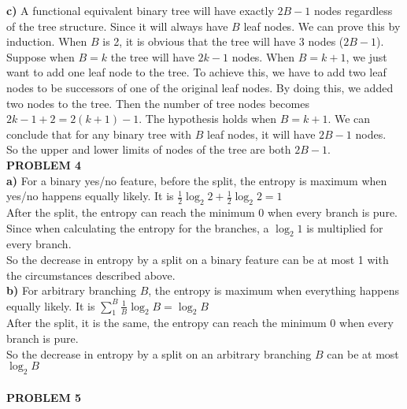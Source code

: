 \documentclass[11pt,a4paper,fleqn]{article}
\begin{document}
\textbf{c)} A functional equivalent binary tree will have exactly $2B-1$ nodes regardless of the tree structure. Since it will always have $B$ leaf nodes. We can prove this by induction. When $B$ is 2, it is obvious that the tree will have 3 nodes ($2B-1$). Suppose when $B=k$ the tree will have $2k-1$ nodes. When $B=k+1$, we just want to add one leaf node to the tree. To achieve this, we have to add two leaf nodes to be successors of one of the original leaf nodes. By doing this, we added two nodes to the tree. Then the number of tree nodes becomes $2k-1+2 = 2(k+1)-1$. The hypothesis holds when $B=k+1$. We can conclude that for any binary tree with $B$ leaf nodes, it will have $2B-1$ nodes.\\
So the upper and lower limits of nodes of the tree are both $2B-1$.\\
\newpage \noindent
\textbf{PROBLEM 4}\\
\textbf{a)} For a binary yes/no feature, before the split, the entropy is maximum when yes/no happens equally likely. It is $\frac{1}{2}\log_2{2}+\frac{1}{2}\log_2{2}=1$\\
After the split, the entropy can reach the minimum 0 when every branch is pure. Since when calculating the entropy for the branches, a $\log_2{1}$ is multiplied for every branch.\\
So the decrease in entropy by a split on a binary feature can be at most 1 with the circumstances described above.\\ 
\textbf{b)} For arbitrary branching $B$, the entropy is maximum when everything happens equally likely. It is $\sum_1^B{\frac{1}{B}\log_2{B}}=\log_2{B}$\\
After the split, it is the same, the entropy can reach the minimum 0 when every branch is pure. \\
So the decrease in entropy by a split on an arbitrary branching $B$ can be at most $\log_2{B}$\\
\\ \noindent
\textbf{PROBLEM 5}\\
\end{document}
